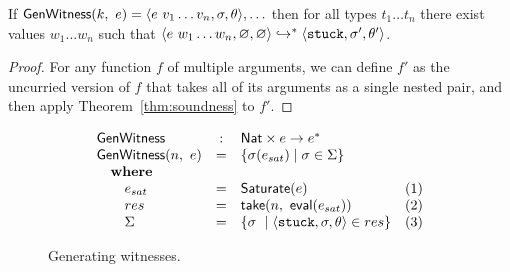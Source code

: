 \begin{cor}
\label{thm:generation}
  If $\mathsf{GenWitness}(k,\ e) = \langle e\ v_1 \ldots v_n, \sigma, \theta \rangle,\ldots$
  then for all types $t_1 \ldots t_n$ there exist values $w_1 \ldots w_n$ such that
  $\langle e\ w_1 \ldots w_n, \varnothing, \varnothing \rangle \hookrightarrow^{*} \langle \mathtt{stuck}, \sigma', \theta' \rangle{}$.
\end{cor}
\begin{proof}
  For any function $f$ of multiple arguments, we can define $f'$ as the
  uncurried version of $f$ that takes all of its arguments as a single
  nested pair, and then apply Theorem~\ref{thm:soundness} to $f'$.
\end{proof}

\begin{figure}[t]
\centering
$$
\begin{array}{lclr}
\mathsf{GenWitness}       & : & \mathsf{Nat} \times e \rightarrow e^{*} & \\
\mathsf{GenWitness}(n,\ e)  & = & \{ \sigma(e_{sat}) \mid \sigma \in \Sigma \} & \\
\quad \mbox{\textbf{where}} &    & & \\
\quad \quad e_{sat} & = & \mathsf{Saturate}(e) & (1) \\
\quad \quad res    & = & \mathsf{take}(n,\ \mathsf{eval}(e_{sat})) & (2) \\
\quad \quad \Sigma & = & \{ \sigma\ \mid \langle \mathtt{stuck}, \sigma, \theta \rangle \in res\} & (3)
\end{array}
$$
\caption{Generating witnesses.}
\label{fig:algo-gen-witness}
\end{figure}

